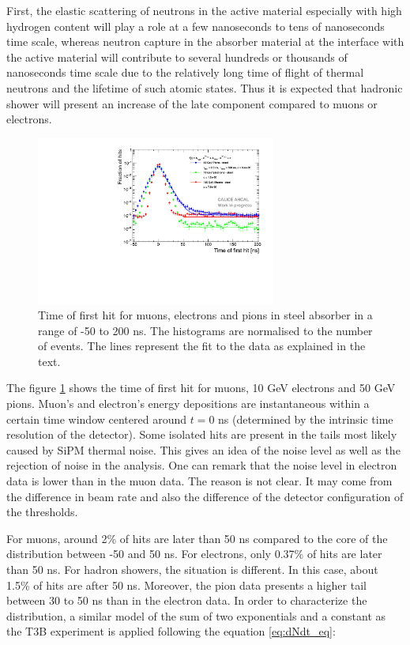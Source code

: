 First, the elastic scattering of neutrons in the active material especially with high hydrogen content will play a role at a few nanoseconds to tens of nanoseconds time scale, whereas neutron capture in the absorber material at the interface with the active material will contribute to several hundreds or thousands of nanoseconds time scale due to the relatively long time of flight of thermal neutrons and the lifetime of such atomic states. Thus it is expected that hadronic shower will present an increase of the late component compared to muons or electrons.

\begin{figure}[htbp!]
	\centering
	\includegraphics[width=0.7\textwidth]{chap5/fig_AHCAL_timing/Pions/Timing_dNdt_Comparison.pdf}
	\caption{Time of first hit for muons, electrons and pions in steel absorber in a range of -50 to 200 ns. The histograms are normalised to the number of events. The lines represent the fit to the data as explained in the text.}
	\label{fig:dNdt_Comparison}
\end{figure}

The figure \ref{fig:dNdt_Comparison} shows the time of first hit for muons, 10 GeV electrons and 50 GeV pions. Muon's and electron's energy depositions are instantaneous within a certain time window centered around $t=0$ ns (determined by the intrinsic time resolution of the detector). Some isolated hits are present in the tails most likely caused by SiPM thermal noise. This gives an idea of the noise level as well as the rejection of noise in the analysis. One can remark that the noise level in electron data is lower than in the muon data. The reason is not clear. It may come from the difference in beam rate and also the difference of the detector configuration of the thresholds.

For muons, around 2\% of hits are later than 50 ns compared to the core of the distribution between -50 and 50 ns. For electrons, only 0.37\% of hits are later than 50 ns. For hadron showers, the situation is different. In this case, about 1.5\% of hits are after 50 ns. Moreover, the pion data presents a higher tail between 30 to 50 ns than in the electron data. In order to characterize the distribution, a similar model of the sum of two exponentials and a constant as the T3B experiment \cite{Simon2013} is applied following the equation \ref{eq:dNdt_eq}:


